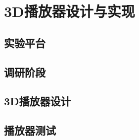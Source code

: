 

\chapter{3D播放器设计与实现}
\label{cha:3Dplayerdesignandrealization}

\section{实验平台}
\label{sec:3dplayerhardwareplatform}


\section{调研阶段}
\label{sec:3Dplayersurvey}




\section{3D播放器设计}
\label{sec:3dplayerdesign}

\section{播放器测试}
\label{sec:3dplayerdemo}


